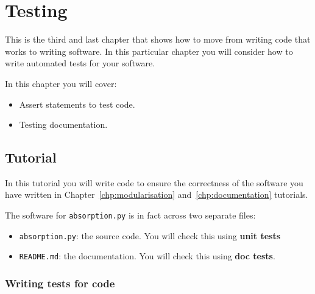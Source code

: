 \chapter{Testing}
\label{chp:testing}

This is the third and last chapter that shows how to move from writing code
that works to writing software. In this particular chapter you will consider how
to write automated tests for your software.

\begin{note}
In this chapter you will cover:
\begin{itemize}
\item 

Assert statements to test code.

\item 

Testing documentation.

\end{itemize}
\end{note}





\section{Tutorial}
\label{sec:testing_tutorial}

In this tutorial you will write code to ensure the correctness of the software
you
have written in Chapter~\ref{chp:modularisation} and~\ref{chp:documentation}
tutorials.

The software for \texttt{absorption.py} is in fact across two separate files:
\begin{itemize}
\item 

\texttt{absorption.py}: the source code. You will check this using \textbf{unit tests}

\item 

\texttt{README.md}: the documentation. You will check this using \textbf{doc tests}.

\end{itemize}


\subsection{Writing tests for code}
\label{\detokenize{building-tools/07-testing/tutorial/main:writing-tests-for-code}}

